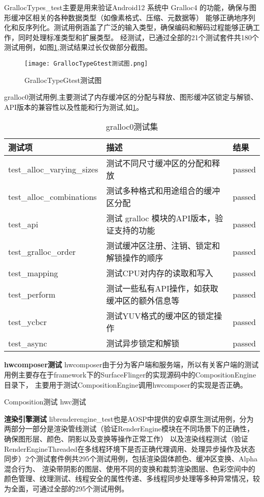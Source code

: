 GrallocTypes\_test主要是用来验证Android12 系统中 Gralloc4 的功能，确保与图形缓冲区相关的各种数据类型（如像素格式、压缩、元数据等）
能够正确地序列化和反序列化。测试用例涵盖了广泛的输入类型，确保编码和解码过程能够正确工作，同时处理标准类型和扩展类型。
经测试，已通过全部的21个测试套件共180个测试用例，如图\ref{fig:GrallocTypeGtest测试图},测试结果过长仅做部分截图。

\begin{figure}[h]
    \centering
    \texttt{[image: GrallocTypeGtest测试图.png]}
    \caption{GrallocTypeGtest测试图}
    \label{fig:GrallocTypeGtest测试图}
\end{figure}

gralloc0测试用例,主要测试了内存缓冲区的分配与释放、图形缓冲区锁定与解锁、API版本的兼容性以及性能和行为测试,如\ref{tab:gralloc0测试集}。

\begin{table}[h]
    \centering
    \caption{gralloc0测试集}
    \label{tab:gralloc0测试集}
    \begin{tabular}{lll}
      \toprule
      测试项   &  描述 & 结果 \\
      \midrule
      test\_alloc\_varying\_sizes & 测试不同尺寸缓冲区的分配和释放 & passed\\
      test\_alloc\_combinations & 测试多种格式和用途组合的缓冲区分配 & passed\\
      test\_api & 测试 gralloc 模块的API版本，验证支持的功能 & passed\\
      test\_gralloc\_order & 测试缓冲区注册、注销、锁定和解锁操作的顺序 & passed\\
      test\_mapping & 测试CPU对内存的读取和写入 & passed\\
      test\_perform & 测试一些私有API操作，如获取缓冲区的额外信息等 & passed\\
      test\_ycbcr & 测试YUV格式的缓冲区的锁定操作 & passed\\
      test\_async & 测试异步锁定和解锁 & passed\\
      \bottomrule
    \end{tabular}
    \note{}
\end{table}

\textbf{hwcomposer测试}
hwcomposer由于分为客户端和服务端，所以有关客户端的测试用例主要存在于framework下的SurfaceFlinger的实现源码中的CompositionEngine目录下，
主要用于测试CompositionEngine调用hwcomposer的实现是否正确。

Composition测试
hwc测试

\textbf{渲染引擎测试}
librenderengine\_test也是AOSP中提供的安卓原生测试用例，分为两部分一部分是渲染管线测试（验证RenderEngine模块在不同场景下的正确性，确保图形层、颜色、阴影以及变换等操作正常工作）
以及渲染线程测试（验证RenderEngineThreaded在多线程环境下是否正确代理调用、处理异步操作及状态同步）2个测试套件例共295个测试用例，包括渲染固体颜色、缓冲区变换、Alpha混合行为、
渲染带阴影的图层、使用不同的变换和裁剪渲染图层、色彩空间中的颜色管理、纹理测试、线程安全的属性传递、多线程同步处理等多种异常情况，较为全面，可通过全部的295个测试用例。

